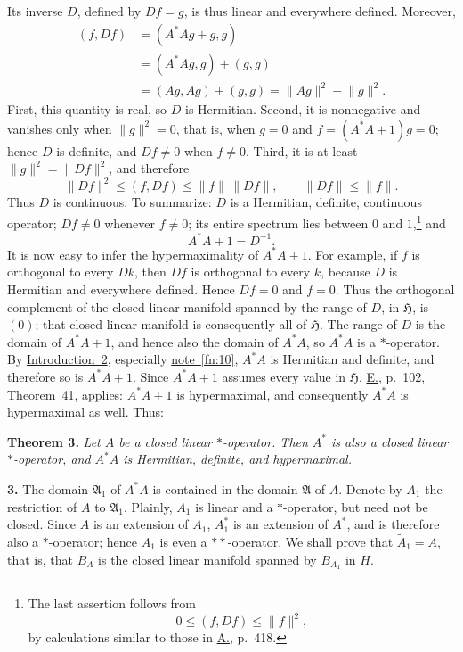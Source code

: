 \documentclass[fontsize=13pt,paper=b5,leqno,bookmarkpackage=false]{scrartcl}
\newcommand{\fnref}[1]{\hyperref[fn:#1]{note~\ref*{fn:#1}}}
\begin{document}
Its inverse \(D\), defined by \(Df=g\), is thus linear and everywhere
defined.  Moreover,
\[
\begin{aligned}
  (f,Df)
    &=(A^*Ag+g,g)\\
    &=(A^*Ag,g)+(g,g)\\
    &=(Ag,Ag)+(g,g)
     =\lVert Ag\rVert^2+\lVert g\rVert^2.
\end{aligned}
\]
First, this quantity is real, so \(D\) is Hermitian.  Second, it is
nonnegative and vanishes only when \(\lVert g\rVert^2=0\), that is, when
\(g=0\) and \(f=(A^*A+1)g=0\); hence \(D\) is definite, and \(Df\ne0\)
when \(f\ne0\).  Third, it is at least
\(\lVert g\rVert^2=\lVert Df\rVert^2\), and therefore
\[
  \lVert Df\rVert^2
  \le (f,Df)
  \le \lVert f\rVert\,\lVert Df\rVert,
  \qquad
  \lVert Df\rVert\le\lVert f\rVert.
\]
Thus \(D\) is continuous.  To summarize: \(D\) is a Hermitian, definite,
continuous operator; \(Df\ne0\) whenever \(f\ne0\); its entire spectrum
lies
between \(0\) and \(1\),\footnote{\label{fn:17}The last assertion follows
from
\[
  0\le(f,Df)\le\lVert f\rVert^2,
\]
by calculations similar to those in \hyperlink{bib:A}{A.}, p.~418.}
and
\[
  A^*A+1=D^{-1}.
\]
It is now easy to infer the hypermaximality of \(A^*A+1\).  For example,
if \(f\) is orthogonal to every \(Dk\), then \(Df\) is orthogonal to every
\(k\), because \(D\) is Hermitian and everywhere defined.  Hence
\(Df=0\) and \(f=0\).  Thus the orthogonal complement of the closed linear
manifold spanned by the range of \(D\), in \(\mathfrak H\), is \((0)\);
that closed linear manifold is consequently all of \(\mathfrak H\).
The range of \(D\) is the domain of \(A^*A+1\), and hence also the domain
of \(A^*A\), so \(A^*A\) is a \(*\)-operator.  By
\hyperref[intro:2]{Introduction~2}, especially
\fnref{10}, \(A^*A\) is Hermitian and definite, and
therefore so is \(A^*A+1\).  Since \(A^*A+1\) assumes every value in
\(\mathfrak H\), \hyperlink{bib:E}{E.}, p.~102, Theorem~41, applies:
\(A^*A+1\) is hypermaximal, and consequently \(A^*A\) is hypermaximal as
well.  Thus:

\par\smallskip
{}
\label{thm:3}
\noindent\textbf{Theorem 3.}
\textit{Let \(A\) be a closed linear \(*\)-operator.  Then \(A^*\) is also
a closed linear \(*\)-operator, and \(A^*A\) is Hermitian, definite, and
hypermaximal.}

\par\smallskip
{}
\label{subsec:I.3}
\noindent\textbf{3.}
The domain \(\mathfrak A_1\) of \(A^*A\) is contained in the domain
\(\mathfrak A\) of \(A\).  Denote by \(A_1\) the restriction of \(A\) to
\(\mathfrak A_1\).  Plainly, \(A_1\) is linear and a \(*\)-operator, but
need not be closed.  Since \(A\) is an extension of \(A_1\), \(A_1^*\) is
an extension of \(A^*\), and is therefore also a \(*\)-operator; hence
\(A_1\) is even a \(**\)-operator.  We shall prove that
\(\widetilde A_1=A\), that is, that \(B_A\) is the closed linear manifold
spanned by \(B_{A_1}\) in \(H\).
\end{document}
